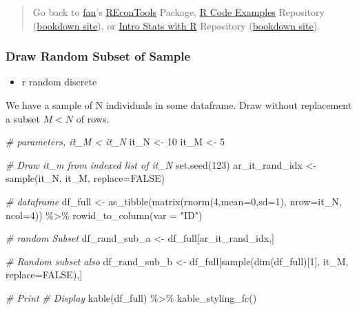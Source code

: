 \documentclass[
]{book}
\newenvironment{Shaded}{\begin{snugshade}}{\end{snugshade}}
\newcommand{\AttributeTok}[1]{\textcolor[rgb]{0.77,0.63,0.00}{#1}}
\newcommand{\CommentTok}[1]{\textcolor[rgb]{0.56,0.35,0.01}{\textit{#1}}}
\newcommand{\ConstantTok}[1]{\textcolor[rgb]{0.00,0.00,0.00}{#1}}
\newcommand{\DecValTok}[1]{\textcolor[rgb]{0.00,0.00,0.81}{#1}}
\newcommand{\FunctionTok}[1]{\textcolor[rgb]{0.00,0.00,0.00}{#1}}
\newcommand{\NormalTok}[1]{#1}
\newcommand{\OtherTok}[1]{\textcolor[rgb]{0.56,0.35,0.01}{#1}}
\newcommand{\SpecialCharTok}[1]{\textcolor[rgb]{0.00,0.00,0.00}{#1}}
\newcommand{\StringTok}[1]{\textcolor[rgb]{0.31,0.60,0.02}{#1}}
\providecommand{\tightlist}{%
  \setlength{\itemsep}{0pt}\setlength{\parskip}{0pt}}
\begin{document}
\begin{quote}
Go back to \href{http://fanwangecon.github.io/}{fan}'s \href{https://fanwangecon.github.io/REconTools/}{REconTools} Package, \href{https://fanwangecon.github.io/R4Econ/}{R Code Examples} Repository (\href{https://fanwangecon.github.io/R4Econ/bookdown}{bookdown site}), or \href{https://fanwangecon.github.io/Stat4Econ/}{Intro Stats with R} Repository (\href{https://fanwangecon.github.io/Stat4Econ/bookdown}{bookdown site}).
\end{quote}

\hypertarget{draw-random-subset-of-sample}{%
\subsubsection{Draw Random Subset of Sample}\label{draw-random-subset-of-sample}}

\begin{itemize}
\tightlist
\item
  r random discrete
\end{itemize}

We have a sample of N individuals in some dataframe. Draw without replacement a subset \(M<N\) of rows.

\begin{Shaded}
\begin{Highlighting}[]
\CommentTok{\# parameters, it\_M \textless{} it\_N}
\NormalTok{it\_N }\OtherTok{\textless{}{-}} \DecValTok{10}
\NormalTok{it\_M }\OtherTok{\textless{}{-}} \DecValTok{5}

\CommentTok{\# Draw it\_m from indexed list of it\_N}
\FunctionTok{set.seed}\NormalTok{(}\DecValTok{123}\NormalTok{)}
\NormalTok{ar\_it\_rand\_idx }\OtherTok{\textless{}{-}} \FunctionTok{sample}\NormalTok{(it\_N, it\_M, }\AttributeTok{replace=}\ConstantTok{FALSE}\NormalTok{)}

\CommentTok{\# dataframe}
\NormalTok{df\_full }\OtherTok{\textless{}{-}} \FunctionTok{as\_tibble}\NormalTok{(}\FunctionTok{matrix}\NormalTok{(}\FunctionTok{rnorm}\NormalTok{(}\DecValTok{4}\NormalTok{,}\AttributeTok{mean=}\DecValTok{0}\NormalTok{,}\AttributeTok{sd=}\DecValTok{1}\NormalTok{), }\AttributeTok{nrow=}\NormalTok{it\_N, }\AttributeTok{ncol=}\DecValTok{4}\NormalTok{)) }\SpecialCharTok{\%\textgreater{}\%} \FunctionTok{rowid\_to\_column}\NormalTok{(}\AttributeTok{var =} \StringTok{"ID"}\NormalTok{)}

\CommentTok{\# random Subset}
\NormalTok{df\_rand\_sub\_a }\OtherTok{\textless{}{-}}\NormalTok{ df\_full[ar\_it\_rand\_idx,]}

\CommentTok{\# Random subset also}
\NormalTok{df\_rand\_sub\_b }\OtherTok{\textless{}{-}}\NormalTok{ df\_full[}\FunctionTok{sample}\NormalTok{(}\FunctionTok{dim}\NormalTok{(df\_full)[}\DecValTok{1}\NormalTok{], it\_M, }\AttributeTok{replace=}\ConstantTok{FALSE}\NormalTok{),]}

\CommentTok{\# Print}
\CommentTok{\# Display}
\FunctionTok{kable}\NormalTok{(df\_full) }\SpecialCharTok{\%\textgreater{}\%} \FunctionTok{kable\_styling\_fc}\NormalTok{()}
\end{Highlighting}
\end{Shaded}
\end{document}
